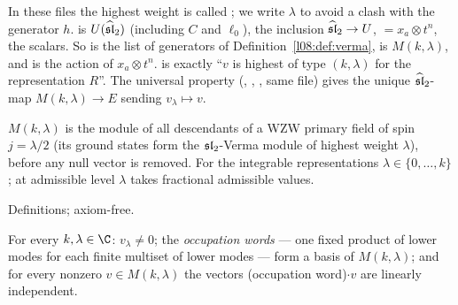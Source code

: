 \begin{dictionary}
In these files the highest weight is called ; we write $\lambda$ to avoid a clash with the generator
$h$.  is $U(\widehat{\mathfrak{sl}}_2)$ (including $C$ and $\ell_0$),  the inclusion
$\widehat{\mathfrak{sl}}_2\to U$,  $=x_a\otimes t^n$,  the scalars. So
 is the list of generators of Definition~\ref{l08:def:verma},  is
$M(k,\lambda)$, and  is the action of $x_a\otimes t^n$.  is exactly
``$v$ is highest of type $(k,\lambda)$ for the representation $R$''. The universal property
(, , \allowbreak{}, same file) gives
the unique $\widehat{\mathfrak{sl}}_2$-map $M(k,\lambda)\to E$ sending $v_\lambda\mapsto v$.
\end{dictionary}

\begin{physics}
$M(k,\lambda)$ is the module of all descendants of a WZW primary field of spin $j=\lambda/2$ (its
ground states form the $\mathfrak{sl}_2$-Verma module of highest weight $\lambda$), before any null vector is
removed. For the integrable representations $\lambda\in\{0,\ldots,k\}$; at admissible level $\lambda$ takes
fractional admissible values.
\end{physics}

\begin{status}
Definitions; axiom-free.
\end{status}

\begin{theorem}\label{l08:thm:vermapbw}
For every $k,\lambda\in\C$: $v_\lambda\ne0$; the \emph{occupation words} --- one fixed product of lower
modes for each finite multiset of lower modes --- form a basis of $M(k,\lambda)$; and for every nonzero
$v\in M(k,\lambda)$ the vectors (occupation word)$\cdot v$ are linearly independent.
\end{theorem}

